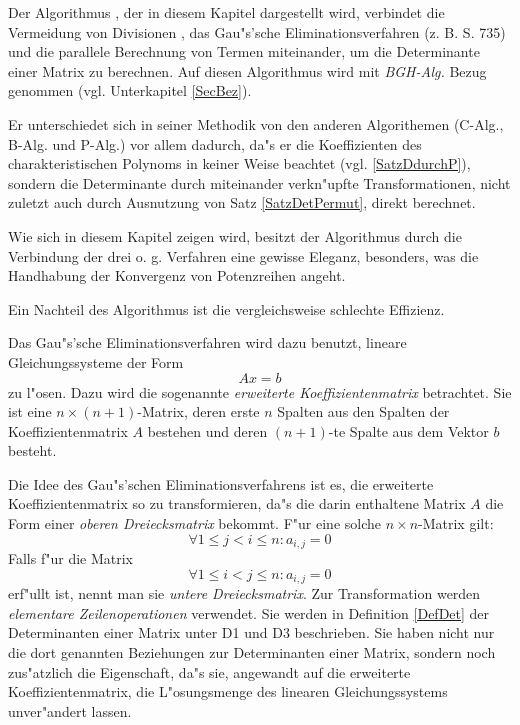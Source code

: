 %
%

\label{ChapBGH}

Der Algorithmus \cite{BGH82}, der in diesem Kapitel dargestellt wird,
verbindet die Vermeidung von Divisionen \cite{Stra73}, das Gau"s'sche
Eliminationsverfahren (z. B. \cite{BS87} S. 735)
und die parallele Berechnung von Termen \cite{VSBR83} miteinander, um
die Determinante einer Matrix zu berechnen. Auf diesen Algorithmus wird
mit {\em BGH-Alg.} Bezug genommen (vgl. Unterkapitel \ref{SecBez}).

Er unterschiedet sich in
seiner Methodik von den anderen Algorithemen (C-Alg., B-Alg. und P-Alg.)
vor allem dadurch, da"s er die Koeffizienten des charakteristischen
Polynoms in keiner Weise beachtet (vgl. \ref{SatzDdurchP}), sondern die
Determinante durch miteinander verkn"upfte Transformationen, nicht zuletzt
auch durch Ausnutzung von Satz \ref{SatzDetPermut}, direkt
berechnet.

Wie sich in diesem Kapitel zeigen wird, besitzt der Algorithmus durch
die Verbindung der drei o. g. Verfahren eine gewisse Eleganz, besonders,
was die Handhabung der Konvergenz von Potenzreihen angeht. 

Ein Nachteil des Algorithmus ist die vergleichsweise schlechte Effizienz.


\label{SecGauss}

Das Gau"s'sche Eliminationsverfahren wird dazu benutzt, lineare
Gleichungssysteme der Form \[ Ax=b \] zu l"osen. Dazu wird die sogenannte
{\em erweiterte Koeffizientenmatrix} betrachtet. Sie ist eine
$n \times (n+1)$-Matrix, deren erste $n$ Spalten aus den Spalten der
Koeffizientenmatrix $A$ bestehen und deren $(n+1)$-te Spalte aus dem
Vektor $b$ besteht.

Die Idee des Gau"s'schen Eliminationsverfahrens ist es, die erweiterte
Koeffizientenmatrix so zu transformieren,
da"s die darin enthaltene Matrix $A$ die Form einer {\em oberen
Dreiecksmatrix}  bekommt. F"ur eine solche
$n \times n$-Matrix gilt:
\[ \forall 1 \leq j < i \leq n: a_{i,j} = 0 \]
Falls f"ur die Matrix
\[ \forall 1 \leq i < j \leq n: a_{i,j} = 0 \]
erf"ullt ist, nennt man sie {\em untere Dreiecksmatrix}.
Zur Transformation werden 
{\em elementare Zeilenoperationen} verwendet.
Sie werden in Definition \ref{DefDet} der Determinanten einer Matrix
unter D1 und D3 beschrieben. Sie haben nicht nur die dort genannten
Beziehungen zur Determinanten einer Matrix, sondern noch zus"atzlich die
Eigenschaft, da"s sie, angewandt auf die erweiterte Koeffizientenmatrix,
die L"osungsmenge des linearen Gleichungssystems unver"andert lassen.

